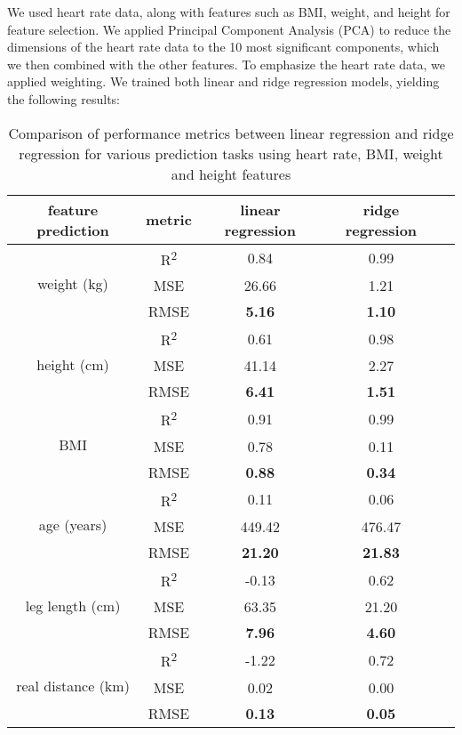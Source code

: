 We used heart rate data, along with features such as BMI, weight, and height for feature selection. We applied Principal Component Analysis (PCA) to reduce the dimensions of the heart rate data to the 10 most significant components, which we then combined with the other features. To emphasize the heart rate data, we applied weighting. We trained both linear and ridge regression models, yielding the following results:

\newpage
\begin{table}[H]
\begin{longtable}{|c|c|c|c|c|}
\hline
\textbf{feature prediction} & \textbf{metric} & \textbf{linear regression} & \textbf{ridge regression} \\
\hline
\multirow{3}{*}{weight (kg)} & R\textsuperscript{2} & 0.84 &0.99\\
& MSE & 26.66  &1.21\\
& RMSE & \textbf{5.16}  &\textbf{1.10}\\
\hline
\multirow{3}{*}{height (cm)} & R\textsuperscript{2} &  0.61 &0.98\\
& MSE & 41.14  &2.27\\
& RMSE & \textbf{6.41}  &\textbf{1.51}\\
\hline
\multirow{3}{*}{BMI} & R\textsuperscript{2} & 0.91 &0.99\\
& MSE & 0.78 &0.11\\
& RMSE & \textbf{0.88} &\textbf{0.34}\\
\hline
\multirow{3}{*}{age (years)} & R\textsuperscript{2} & 0.11 & 0.06\\
& MSE & 449.42 & 476.47\\
& RMSE & \textbf{21.20} &\textbf{21.83}\\
\hline
\multirow{3}{*}{leg length (cm)} & R\textsuperscript{2} & -0.13&0.62\\
& MSE & 63.35&21.20\\
& RMSE & \textbf{7.96} &\textbf{4.60}\\
\hline
\multirow{3}{*}{real distance (km)} & R\textsuperscript{2} & -1.22&0.72\\
& MSE & 0.02 &0.00\\
& RMSE & \textbf{0.13} &\textbf{0.05}\\
\hline
\end{longtable}
\caption{Comparison of performance metrics between linear regression and ridge regression for various prediction tasks using heart rate, BMI, weight and height features}
\label{tab:PCAallfeatures}
\end{table}


